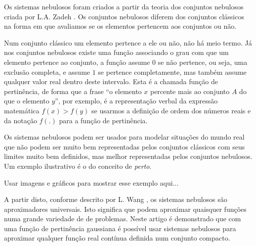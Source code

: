 Os sistemas nebulosos foram criados a partir da teoria dos conjuntos nebulosos criada por L.A. Zadeh \citep{fuzzy_1}. Os conjuntos nebulosos diferem dos conjuntos clássicos na forma em que avaliamos se os elementos pertencem aos conjuntos ou não. 

Num conjunto clássico um elemento pertence a ele ou não, não há meio termo. Já nos conjuntos nebulosos existe uma função associando o grau com que um elemento pertence ao conjunto, a função assume $0$ se não pertence, ou seja, uma exclusão completa, e assume $1$ se pertence completamente, mas também assume qualquer valor real dentro deste intervalo. Esta é a chamada função de pertinência, de forma que a frase ``o elemento $x$ percente mais ao conjunto $A$ do que o elemento $y$'', por exemplo, é a representação verbal da expressão matemática $f(x) > f(y)$ se usarmos a definição de ordem dos números reais e da notação $f(.)$ para a função de pertinência.

Os sistemas nebulosos podem ser usados para modelar situações do mundo real que não podem ser muito bem representadas pelos conjuntos clássicos com seus limites muito bem definidos, mas melhor representadas pelos conjuntos nebulosos. Um exemplo ilustrativo é o do conceito de \emph{perto}.

Usar imagens e gráficos para mostrar esse exemplo aqui...

A partir disto, conforme descrito por L. Wang \citep{fuzzy_2}, os sistemas nebulosos são aproximadores universais. Isto significa que podem aproximar quaisquer funções numa grande variedade de de problemas. Neste artigo é demonstrado que com uma função de pertinência gaussiana é possível usar sistemas nebulosos para aproximar qualquer função real contínua definida num conjunto compacto.